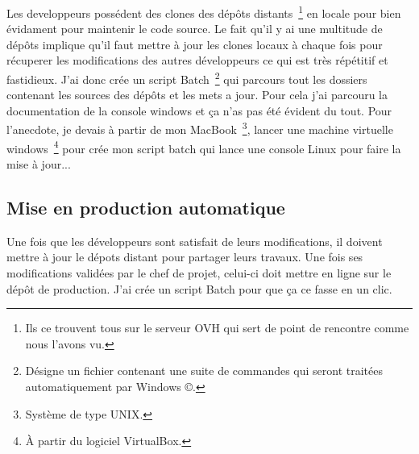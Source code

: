 Les developpeurs possédent des clones des dépôts distants\, \footnote{Ils ce
trouvent tous sur le serveur OVH qui sert de point de rencontre comme nous
l'avons vu.} en locale pour bien évidament pour maintenir le code source. Le
fait qu'il y ai une multitude de dépôts implique qu'il faut mettre à jour les
clones locaux à chaque fois pour récuperer les modifications des autres
développeurs ce qui est très répétitif et fastidieux. J'ai donc crée un script
Batch\, \footnote{Désigne un fichier contenant une suite de commandes qui
seront traitées automatiquement par Windows \copyright.} qui parcours tout les
dossiers contenant les sources des dépôts et les mets a jour. Pour cela j'ai
parcouru la documentation de la console windows et ça n'as pas été évident du
tout. Pour l'anecdote, je devais à partir de mon MacBook\, \footnote{Système de
type UNIX.}, lancer une machine virtuelle windows\, \footnote{À partir du
logiciel VirtualBox.} pour crée mon script batch qui lance une console Linux
pour faire la mise à jour...


\subsection{Mise en production automatique} %

Une fois que les développeurs sont satisfait de leurs modifications, il doivent
mettre à jour le dépots distant pour partager leurs travaux. Une fois ses
modifications validées par le chef de projet, celui-ci doit mettre en ligne sur
le dépôt de production. J'ai crée un script Batch pour que ça ce fasse en un
clic.

\clearpage
